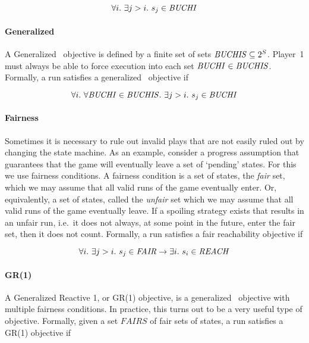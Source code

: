 \begin{equation}
\forall i.\ \exists j>i.\ s_j \in \mathit{BUCHI}
\end{equation}

\paragraph{Generalized \buchi}
A Generalized \buchi\ objective is defined by a finite set of sets $\mathit{BUCHIS} \subseteq 2^S$. Player~1 must always be able to force execution into each set $\mathit{BUCHI} \in \mathit{BUCHIS}$. Formally, a run satisfies a generalized \buchi\ objective if 

\begin{equation}
\forall i.\ \forall \mathit{BUCHI} \in \mathit{BUCHIS}.\ \exists j>i.\ s_j \in \mathit{BUCHI}
\end{equation}

\paragraph{Fairness}
Sometimes it is necessary to rule out invalid plays that are not easily ruled out by changing the state machine. As an example, consider a progress assumption that guarantees that the game will eventually leave a set of `pending' states. For this we use fairness conditions. A fairness condition is a set of states, the \emph{fair} set, which we may assume that all valid runs of the game eventually enter. Or, equivalently, a set of states, called the \emph{unfair} set which we may assume that all valid runs of the game eventually leave. If a spoiling strategy exists that results in an unfair run, i.e.\ it does not always, at some point in the future, enter the fair set, then it does not count. Formally, a run satisfies a fair reachability objective if 

\begin{equation}
\forall i.\ \exists j>i.\ s_j \in \mathit{FAIR} \rightarrow \exists i.\ s_i \in \mathit{REACH}
\end{equation}

\paragraph{GR(1)}
A Generalized Reactive 1, or GR(1) \cite{gr1} objective, is a generalized \buchi\ objective with multiple fairness conditions. In practice, this turns out to be a very useful type of objective. Formally, given a set $FAIRS$ of fair sets of states, a run satisfies a GR(1) objective if 

